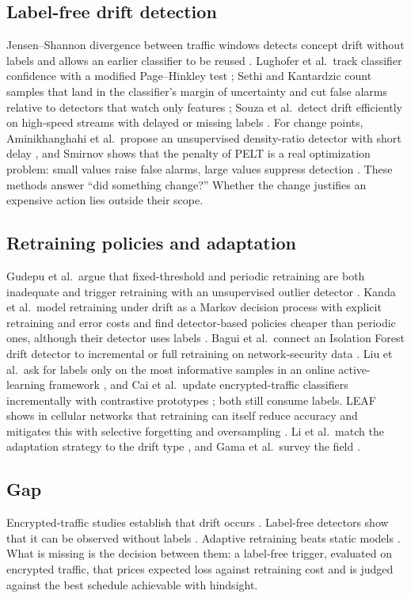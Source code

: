 \documentclass[conference]{IEEEtran}
\begin{document}
\subsection{Label-free drift detection}
Jensen--Shannon divergence between traffic windows detects concept drift without labels and allows an earlier classifier to be reused \cite{yang2022}. Lughofer et al.\ track classifier confidence with a modified Page--Hinkley test \cite{lughofer2016}; Sethi and Kantardzic count samples that land in the classifier's margin of uncertainty and cut false alarms relative to detectors that watch only features \cite{sethi2017}; Souza et al.\ detect drift efficiently on high-speed streams with delayed or missing labels \cite{souza2020}. For change points, Aminikhanghahi et al.\ propose an unsupervised density-ratio detector with short delay \cite{aminikhanghahi2019}, and Smirnov shows that the penalty of PELT is a real optimization problem: small values raise false alarms, large values suppress detection \cite{smirnov2023}. These methods answer ``did something change?'' Whether the change justifies an expensive action lies outside their scope.

\subsection{Retraining policies and adaptation}
Gudepu et al.\ argue that fixed-threshold and periodic retraining are both inadequate and trigger retraining with an unsupervised outlier detector \cite{gudepu2023}. Kanda et al.\ model retraining under drift as a Markov decision process with explicit retraining and error costs and find detector-based policies cheaper than periodic ones, although their detector uses labels \cite{kanda2023}. Bagui et al.\ connect an Isolation Forest drift detector to incremental or full retraining on network-security data \cite{bagui2025}. Liu et al.\ ask for labels only on the most informative samples in an online active-learning framework \cite{liu2023oal}, and Cai et al.\ update encrypted-traffic classifiers incrementally with contrastive prototypes \cite{cai2024}; both still consume labels. LEAF shows in cellular networks that retraining can itself reduce accuracy and mitigates this with selective forgetting and oversampling \cite{liu2023leaf}. Li et al.\ match the adaptation strategy to the drift type \cite{li2024}, and Gama et al.\ survey the field \cite{gama2014}.

\subsection{Gap}
Encrypted-traffic studies establish that drift occurs \cite{luxemburk2023,kurapov2024,jancicka2024,malekghaini2023}. Label-free detectors show that it can be observed without labels \cite{yang2022,lughofer2016,sethi2017,souza2020}. Adaptive retraining beats static models \cite{gudepu2023,kanda2023,bagui2025,liu2023oal,cai2024}. What is missing is the decision between them: a label-free trigger, evaluated on encrypted traffic, that prices expected loss against retraining cost and is judged against the best schedule achievable with hindsight.
\end{document}

